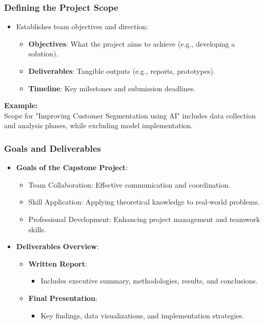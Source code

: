 \documentclass{beamer}
\begin{document}
\begin{frame}[fragile]
    \frametitle{Defining the Project Scope}
    \begin{itemize}
        \item Establishes team objectives and direction:
            \begin{itemize}
                \item \textbf{Objectives}: What the project aims to achieve (e.g., developing a solution).
                \item \textbf{Deliverables}: Tangible outputs (e.g., reports, prototypes).
                \item \textbf{Timeline}: Key milestones and submission deadlines.
            \end{itemize}
    \end{itemize}
    \textbf{Example:} \\
    Scope for "Improving Customer Segmentation using AI" includes data collection and analysis phases, while excluding model implementation.
\end{frame}

\begin{frame}[fragile]
    \frametitle{Goals and Deliverables}
    \begin{itemize}
        \item \textbf{Goals of the Capstone Project}:
            \begin{itemize}
                \item Team Collaboration: Effective communication and coordination.
                \item Skill Application: Applying theoretical knowledge to real-world problems.
                \item Professional Development: Enhancing project management and teamwork skills.
            \end{itemize}
        \item \textbf{Deliverables Overview}:
            \begin{itemize}
                \item \textbf{Written Report}: 
                    \begin{itemize}
                        \item Includes executive summary, methodologies, results, and conclusions.
                    \end{itemize}
                \item \textbf{Final Presentation}: 
                    \begin{itemize}
                        \item Key findings, data visualizations, and implementation strategies.
                    \end{itemize}
            \end{itemize}
    \end{itemize}
\end{frame}
\end{document}
